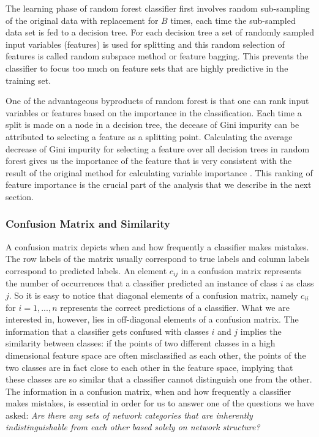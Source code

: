 The learning phase of random forest classifier first involves random sub-sampling of the original data with replacement for $B$ times, each time the sub-sampled data set is fed to a decision tree. For each decision tree a set of randomly sampled input variables (features) is used for splitting and this random selection of features is called random subspace method or feature bagging. This prevents the classifier to focus too much on feature sets that are highly predictive in the training set. 

One of the advantageous byproducts of random forest is that one can rank input variables or features based on the importance in the classification. Each time a split is made on a node in a decision tree, the decease of Gini impurity can be attributed to selecting a feature as a splitting point.  Calculating the average decrease of Gini impurity for selecting a feature over all decision trees in random forest gives us the importance of the feature that is very consistent with the result of the original method for calculating variable importance \cite{RandomForest,RandomForestOnline}. This ranking of feature importance is the crucial part of the analysis that we describe in the next section.


		\subsubsection*{Confusion Matrix and Similarity}
	A confusion matrix depicts when and how frequently a classifier makes mistakes. The row labels of the matrix usually correspond to  true labels and column labels correspond to predicted labels. An element $c_{ij}$ in a confusion matrix represents the number of occurrences that a classifier predicted an instance of class $i$ as class $j$. So it is easy to notice that diagonal elements of a confusion matrix, namely $c_{ii}$ for $i = 1,...,n$ represents the correct predictions of a classifier. What we are interested in, however, lies in off-diagonal elements of a confusion matrix. The information that a classifier gets confused with classes $i$ and $j$ implies the similarity between classes: if the points of two different classes in a high dimensional feature space are often misclassified as each other, the points of the two classes are in fact close to each other in the feature space, implying that these classes are so similar that a classifier cannot distinguish one from the other. The information in a confusion matrix, when and how frequently a classifier makes mistakes, is essential in order for us to answer one of the questions we have asked: \textit{Are there any sets of network categories that are inherently indistinguishable from each other based solely on network structure?}

